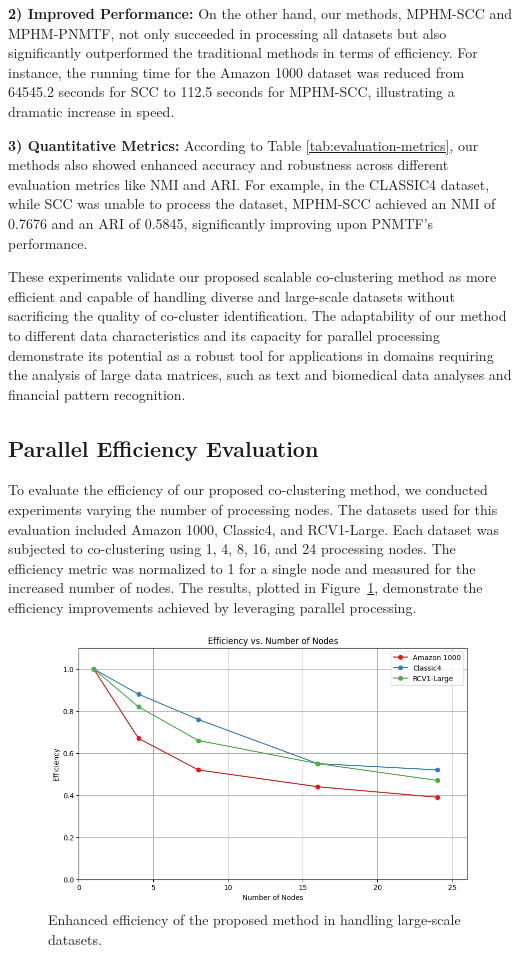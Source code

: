 \documentclass[journal]{IEEEtran}
\begin{document}
\textbf{2) Improved Performance:} On the other hand, our methods, MPHM-SCC and MPHM-PNMTF, not only succeeded in processing all datasets but also significantly outperformed the traditional methods in terms of efficiency. For instance, the running time for the Amazon 1000 dataset was reduced from 64545.2 seconds for SCC to 112.5 seconds for MPHM-SCC, illustrating a dramatic increase in speed.

\textbf{3) Quantitative Metrics:} According to Table \ref{tab:evaluation-metrics}, our methods also showed enhanced accuracy and robustness across different evaluation metrics like NMI and ARI. For example, in the CLASSIC4 dataset, while SCC was unable to process the dataset, MPHM-SCC achieved an NMI of 0.7676 and an ARI of 0.5845, significantly improving upon PNMTF's performance.

These experiments validate our proposed scalable co-clustering method as more efficient and capable of handling diverse and large-scale datasets without sacrificing the quality of co-cluster identification. The adaptability of our method to different data characteristics and its capacity for parallel processing demonstrate its potential as a robust tool for applications in domains requiring the analysis of large data matrices, such as text and biomedical data analyses and financial pattern recognition.

\subsection{Parallel Efficiency Evaluation}
To evaluate the efficiency of our proposed co-clustering method, we conducted experiments varying the number of processing nodes. The datasets used for this evaluation included Amazon 1000, Classic4, and RCV1-Large. Each dataset was subjected to co-clustering using 1, 4, 8, 16, and 24 processing nodes. The efficiency metric was normalized to 1 for a single node and measured for the increased number of nodes. The results, plotted in Figure~\ref{fig:efficiency}, demonstrate the efficiency improvements achieved by leveraging parallel processing.

\begin{figure}[htbp]
  \centering
  \includegraphics[width=0.8\linewidth]{efficiency.jpg}
  \caption{Enhanced efficiency of the proposed method in handling large-scale datasets.}
  \label{fig:efficiency}
\end{figure}
\end{document}

